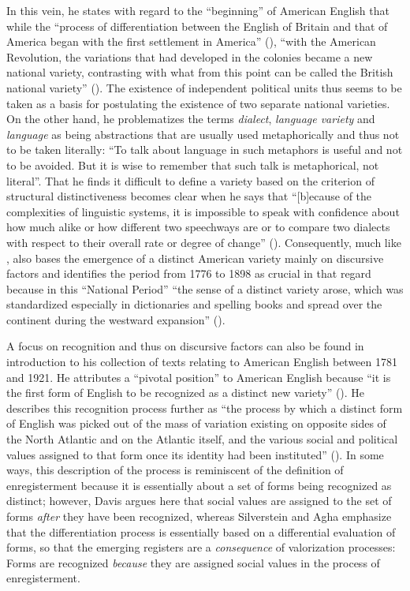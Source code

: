 In this vein, he states with regard to the “beginning” of American English that while the “process of differentiation between the English of Britain and that of America began with the first settlement in America” (\citeyear[xvi]{Algeo2001b}), “with the American Revolution, the variations that had developed in the colonies became a new national variety, contrasting with what from this point can be called the British national variety” (\citeyear[xviii]{Algeo2001b}). The existence of independent political units thus seems to be taken as a basis for postulating the existence of two separate national varieties. On the other hand, he problematizes the terms \textit{dialect}, \textit{language variety} and \textit{language} as being abstractions that are usually used metaphorically and thus not to be taken literally: “To talk about language in such metaphors is useful and not to be avoided. But it is wise to remember that such talk is metaphorical, not literal”. That he finds it difficult to define a variety based on the criterion of structural distinctiveness becomes clear when he says that “[b]ecause of the complexities of linguistic systems, it is impossible to speak with confidence about how much alike or how different two speechways are or to compare two dialects with respect to their overall rate or degree of change” (\citeyear[xix]{Algeo2001b}). Consequently, much like \citet{Bailey2017}, \citet{Algeo2001b} also bases the emergence of a distinct American variety mainly on discursive factors and identifies the period from 1776 to 1898 as crucial in that regard because in this “National Period” “the sense of a distinct variety arose, which was standardized especially in dictionaries and spelling books and spread over the continent during the westward expansion” (\citeyear[xx]{Algeo2001b}).

A focus on recognition and thus on discursive factors can also be found in  introduction to his collection of texts relating to American English between 1781 and 1921. He attributes a “pivotal position” to American English because “it is the first form of English to be recognized as a distinct new variety” (\citeyear[xi]{Davis2003}). He describes this recognition process further as “the process by which a distinct form of English was picked out of the mass of variation existing on opposite sides of the North Atlantic and on the Atlantic itself, and the various social and political values assigned to that form once its identity had been instituted” (\citeyear[xi]{Davis2003}). In some ways, this description of the process is reminiscent of the definition of enregisterment because it is essentially about a set of forms being recognized as distinct; however, Davis argues here that social values are assigned to the set of forms \emph{after} they have been recognized, whereas Silverstein and Agha emphasize that the differentiation process is essentially based on a differential evaluation of forms, so that the emerging registers are a \emph{consequence} of valorization processes: Forms are recognized \emph{because} they are assigned social values in the process of enregisterment.

